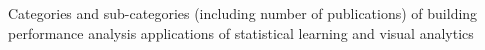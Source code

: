 Categories and sub-categories (including number of publications) of building performance analysis applications of statistical learning and visual analytics
\label{fig:categoriespie}
